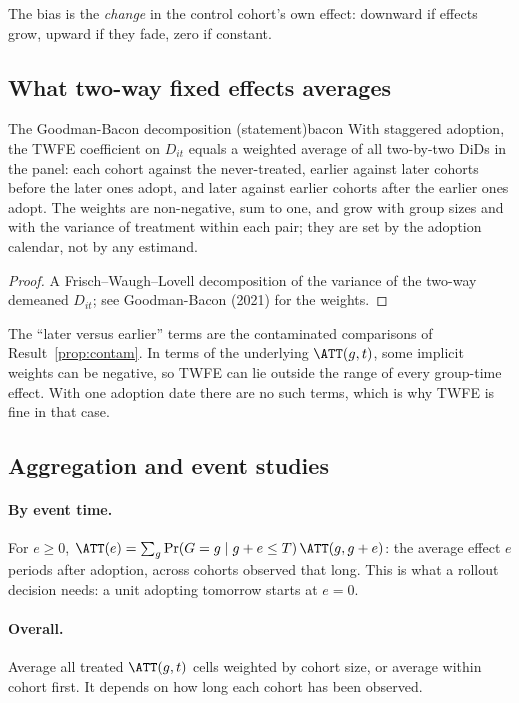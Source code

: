\documentclass[11pt]{article}
\begin{document}
The bias is the \emph{change} in the control cohort's own effect: downward if effects grow, upward if they fade, zero if constant.

\subsection{What two-way fixed effects averages}

\begin{prop}{The Goodman-Bacon decomposition (statement)}{bacon}
With staggered adoption, the TWFE coefficient on $D_{it}$ equals a weighted average of all two-by-two DiDs in the panel: each cohort against the
never-treated, earlier against later cohorts before the later ones adopt, and later against earlier cohorts after the earlier ones adopt. The weights are
non-negative, sum to one, and grow with group sizes and with the variance of treatment within each pair; they are set by the adoption calendar, not by
any estimand.
\end{prop}
\begin{proof}
A Frisch--Waugh--Lovell decomposition of the variance of the two-way demeaned $D_{it}$; see Goodman-Bacon (2021) for the weights.
\end{proof}

The ``later versus earlier'' terms are the contaminated comparisons of Result~\ref{prop:contam}. In terms of the underlying $\ATT(g,t)$, some implicit weights
can be negative, so TWFE can lie outside the range of every group-time effect. With one adoption date there are no such terms, which is why TWFE is fine in
that case.

\subsection{Aggregation and event studies}

\paragraph{By event time.} For $e \ge 0$, $\ATT(e) = \sum_g \Pr(G = g \mid g + e \le T)\,\ATT(g, g+e)$: the average effect $e$ periods after adoption, across
cohorts observed that long. This is what a rollout decision needs: a unit adopting tomorrow starts at $e = 0$.

\paragraph{Overall.} Average all treated $\ATT(g,t)$ cells weighted by cohort size, or average within cohort first. It depends on how long each cohort has been
observed.
\end{document}
